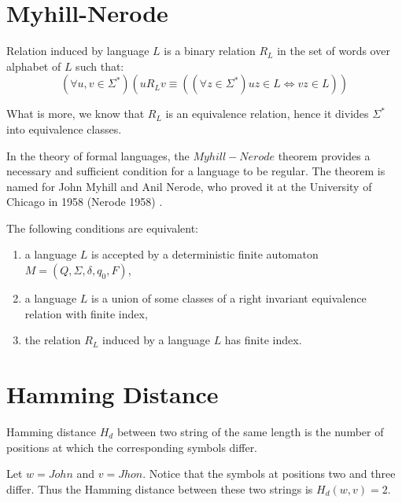 \documentclass{mini}
\begin{document}
\section{Myhill-Nerode}
\begin{definition} \label{def:myhill}
    Relation induced by language $L$ is a binary relation $R_{L}$ in the set of words over alphabet of $L$ such that:
    \[
    (\forall{u,v \in \Sigma^{*}})(u R_{L} v \equiv ((\forall z \in \Sigma^{*}) uz \in L \Leftrightarrow vz \in L))
    \]
\end{definition}
What is more, we know that $R_{L}$ is an equivalence relation, hence it divides $\Sigma^{*}$ into equivalence classes.

In the theory of formal languages, the $Myhill-Nerode$ theorem provides a necessary and sufficient condition for a language to be regular. The theorem is named for John Myhill and Anil Nerode, who proved it at the University of Chicago in 1958 (Nerode 1958) \cite{Myhill_Nerode}.

\begin{theorem}\label{Theorem:Myhill_Nerode}
    The following conditions are equivalent:
    \begin{enumerate}
        \item a language $L$ is accepted by a deterministic finite automaton $M = (Q,\Sigma,\delta,q_0,F)$,
        \item a language $L$ is a union of some classes of a right invariant equivalence relation with finite index,
        \item the relation $R_{L}$ induced by a language $L$ has finite index.
    \end{enumerate}
\end{theorem}

\section{Hamming Distance} \label{sec:hamming}

\begin{definition}
Hamming distance $H_d$ between two string of the same length is the number of positions at which the corresponding symbols differ.
\end{definition}

\begin{example} 
Let $w = John$ and $v = Jhon$. Notice that the symbols at positions two and three differ. Thus the Hamming distance between these two strings is $H_d(w,v) = 2$.
\end{example}
\end{document}
